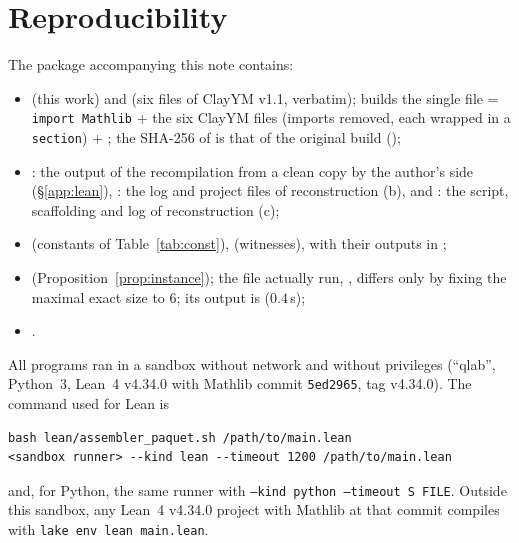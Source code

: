 \documentclass[11pt,a4paper]{article}
\theoremstyle{plain}
\theoremstyle{definition}
\theoremstyle{remark}
\numberwithin{equation}{section}
\begin{document}
\section{Reproducibility}\label{sec:repro}
The package accompanying this note contains:
\begin{itemize}
\item {} (this work) and  (six files of ClayYM v1.1, verbatim);
 builds the single file  = \texttt{import Mathlib} + the six ClayYM files (imports
removed, each wrapped in a \texttt{section}) + ; the SHA-256 of  is that of the original build
();
\item {}: the output of the recompilation from a clean copy by the author's side (\S\ref{app:lean}), 
: the log and project files of reconstruction (b), and : the script, scaffolding and log of reconstruction (c);
\item {} (constants of Table~\ref{tab:const}),  (witnesses), with their
outputs in ;
\item {} (Proposition~\ref{prop:instance}); the file actually run, , differs
only by fixing the maximal exact size to $6$; its output is  ($0.4$\,s);
\item {}.
\end{itemize}
All programs ran in a sandbox without network and without privileges (``qlab'', Python~3, Lean~4 v4.34.0 with Mathlib commit
\texttt{5ed2965}, tag v4.34.0). The command used for Lean is
{\footnotesize
\begin{verbatim}
bash lean/assembler_paquet.sh /path/to/main.lean
<sandbox runner> --kind lean --timeout 1200 /path/to/main.lean
\end{verbatim}}
\noindent and, for Python, the same runner with \texttt{--kind python --timeout S FILE}. Outside this sandbox, any Lean~4 v4.34.0 project with
Mathlib at that commit compiles  with \texttt{lake env lean main.lean}.

\appendix
\end{document}

